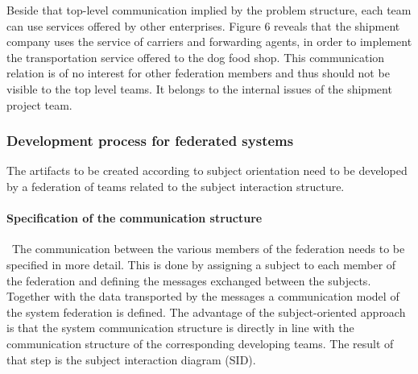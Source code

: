 Beside that top-level communication implied by the problem structure, each team can use services offered by other enterprises. Figure 6 reveals that the shipment company uses the service of carriers and forwarding agents, in order to implement the transportation service offered to the dog food shop. This communication relation is of no interest for other federation members and thus should not be visible to the top level teams. It belongs to the internal issues of the shipment project team.
\\
\subsubsection{Development process for federated systems}
 The artifacts to be created according to subject orientation need to be developed by a federation of teams related to the subject interaction structure.
 
\paragraph{Specification of the communication structure}\
The communication between the various members of the federation needs to be specified in more detail. This is done by assigning a subject to each member of the federation and defining the messages exchanged between the subjects. Together with the data transported by the messages a communication model of the system federation is defined. The advantage of the subject-oriented approach is that the system communication structure is directly in line with the communication structure of the corresponding developing teams. The result of that step is the subject interaction diagram (SID). 

